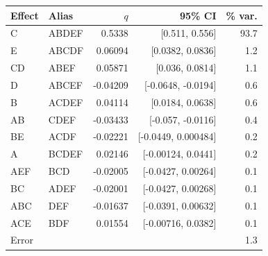 \begin{tabular}{@{}llrrr@{}}
\toprule
Effect & Alias & $q$ & 95\% CI & \% var. \\
\midrule
C & ABDEF & 0.5338 & [0.511, 0.556] & 93.7 \\
E & ABCDF & 0.06094 & [0.0382, 0.0836] & 1.2 \\
CD & ABEF & 0.05871 & [0.036, 0.0814] & 1.1 \\
D & ABCEF & -0.04209 & [-0.0648, -0.0194] & 0.6 \\
B & ACDEF & 0.04114 & [0.0184, 0.0638] & 0.6 \\
AB & CDEF & -0.03433 & [-0.057, -0.0116] & 0.4 \\
BE & ACDF & -0.02221 & [-0.0449, 0.000484] & 0.2 \\
A & BCDEF & 0.02146 & [-0.00124, 0.0441] & 0.2 \\
AEF & BCD & -0.02005 & [-0.0427, 0.00264] & 0.1 \\
BC & ADEF & -0.02001 & [-0.0427, 0.00268] & 0.1 \\
ABC & DEF & -0.01637 & [-0.0391, 0.00632] & 0.1 \\
ACE & BDF & 0.01554 & [-0.00716, 0.0382] & 0.1 \\
Error & & & & 1.3 \\
\bottomrule
\end{tabular}
